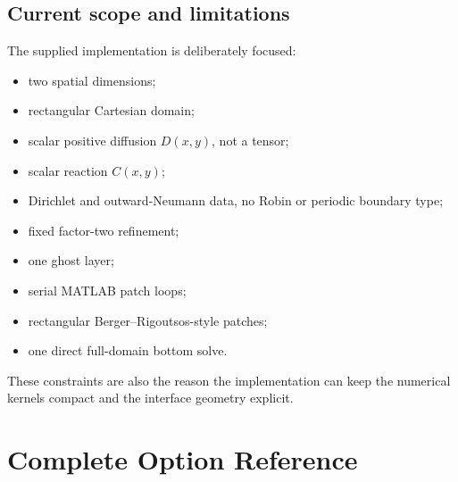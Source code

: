 \documentclass[11pt,oneside,openany]{book}
\begin{document}
\section{Current scope and limitations}
The supplied implementation is deliberately focused:
\begin{itemize}
\item two spatial dimensions;
\item rectangular Cartesian domain;
\item scalar positive diffusion $D(x,y)$, not a tensor;
\item scalar reaction $C(x,y)$;
\item Dirichlet and outward-Neumann data, no Robin or periodic boundary type;
\item fixed factor-two refinement;
\item one ghost layer;
\item serial MATLAB patch loops;
\item rectangular Berger--Rigoutsos-style patches;
\item one direct full-domain bottom solve.
\end{itemize}
These constraints are also the reason the implementation can keep the numerical kernels compact and the interface geometry explicit.

\appendix
\chapter{Complete Option Reference}
\label{app:options}
\end{document}
